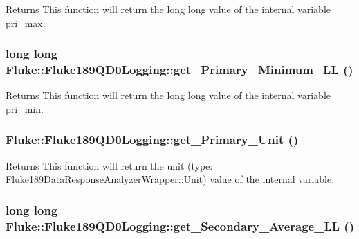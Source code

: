 \label{classFluke_1_1Fluke189QD0Logging_a583f6614ac6b917bb151cd4cd93dc41d}
\begin{DoxyReturn}{Returns}
This function will return the long long value of the internal variable pri\_\-max. 
\end{DoxyReturn}
\hypertarget{classFluke_1_1Fluke189QD0Logging_af4535d1fe0f684efc4ffe4df66a3cec6}{
\subsubsection[{get\_\-Primary\_\-Minimum\_\-LL}]{\setlength{\rightskip}{0pt plus 5cm}long long Fluke::Fluke189QD0Logging::get\_\-Primary\_\-Minimum\_\-LL ()}}
\label{classFluke_1_1Fluke189QD0Logging_af4535d1fe0f684efc4ffe4df66a3cec6}
\begin{DoxyReturn}{Returns}
This function will return the long long value of the internal variable pri\_\-min. 
\end{DoxyReturn}
\hypertarget{classFluke_1_1Fluke189QD0Logging_a864f0f60f6995d5d035163caf0651565}{
\subsubsection[{get\_\-Primary\_\-Unit}]{ Fluke::Fluke189QD0Logging::get\_\-Primary\_\-Unit ()}}
\label{classFluke_1_1Fluke189QD0Logging_a864f0f60f6995d5d035163caf0651565}
\begin{DoxyReturn}{Returns}
This function will return the unit (type: \hyperlink{classFluke_1_1Fluke189DataResponseAnalyzerWrapper_ab8e5f2306e4d2ad3d741d273793aaed1}{Fluke189DataResponseAnalyzerWrapper::Unit}) value of the internal variable. 
\end{DoxyReturn}
\hypertarget{classFluke_1_1Fluke189QD0Logging_a1f33bcc2d2342018f0a1ef5b4ec3caa0}{
\subsubsection[{get\_\-Secondary\_\-Average\_\-LL}]{\setlength{\rightskip}{0pt plus 5cm}long long Fluke::Fluke189QD0Logging::get\_\-Secondary\_\-Average\_\-LL ()}}
